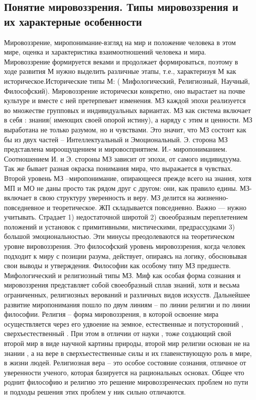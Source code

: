 \documentclass[12pt]{article}
\begin{document}
\subsection{Понятие мировоззрения. Типы мировоззрения и их характерные особенности}
Мировоззрение, миропонимание-взгляд на мир и положение человека в этом мире, оценка и характеристика
взаимоотношений человека и мира. Мировоззрение формируется веками и продолжает формироваться, поэтому
в ходе развития М нужно выделить различные этапы, т.е., характеризуя М как историческое.Исторические типы
М: ( Мифологический, Религиозный, Научный, Философский). 
Мировоззрение   исторически  конкретно,  оно  вырастает  на  почве  культуре  и  вместе  с  ней  претерпевает
изменения. МЗ каждой эпохи  реализуется во  множестве  групповых  и индивидуальных  вариантах.  МЗ  как
система включает в себя : знания( имеющих своей опорой истину), а наряду с этим и ценности. МЗ выработана
не только разумом, но и чувствами. Это значит, что МЗ состоит как бы из двух частей – Интеллектуальный и
Эмоциональный.  Э.  сторона  МЗ  представлена  мироощущением  и  мировосприятием.  И.-  миропониманием.
Соотношением И. и Э. стороны МЗ зависит от эпохи, от самого индивидуума. Так же бывает разная окраска
понимания мира, что выражается в чувствах. Второй уровень МЗ –миропонимание, опирающееся прежде всего
на знания, хотя МП и МО не даны просто так рядом друг с другом: они, как правило едины. МЗ- включает в
свою структуру уверенность и веру. МЗ делится на жизненно-повседневное и теоретическое. ЖП складывается
повседневно. Важно — нужно учитывать. Страдает 1) недостаточной широтой 2) своеобразным переплетением 
положений и установок с примитивными, мистическими, предрассудками 3) большой эмоциональностью. Эти
минусы преодолеваются на теоретическом уровне вировоззрения. Это философский уровень мировоззрения,
когда человек подходит к миру с позиции разума, действует, опираясь на логику, обосновывая свои выводы и
утверждения.
Философии как особому типу МЗ предшеств. Мифологический и религиозный типы МЗ.
Миф как особая форма сознания и мировоззрения представляет собой своеобразный сплав знаний, хотя и
весьма ограниченных, религиозных верований и различных видов искусств.
Дальнейшее развитие миропонимания пошло по двум линиям – по линии религии и по линии философии.
Религия  –  форма мировоззрения, в которой освоение мира осуществляется через его удвоение на земное,
естественные и потусторонний , сверхъестественный . При этом в отличии от науки , тоже создающий свой
второй  мир  в  виде  научной  картины  природы,  второй  мир  религии  основан  не  на  знании  ,  а  на  вере  в
сверхъестественные силы и их главенствующую роль в мире, в жизни людей. Религиозная вера – это особое
состояние сознания, отличное от уверенности ученого, которая базируется на рациональных основах.
Общее что роднит философию и религию это решение мировоззренческих проблем но пути и подходы решения
этих проблем у ник сильно отличаются.
\end{document}
